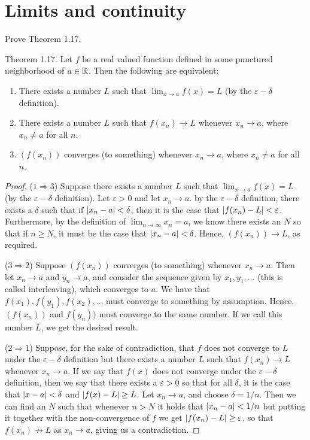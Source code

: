 \section{Limits and continuity}


\begin{exercise}{40}
Prove Theorem 1.17. 

Theorem 1.17. Let $f$ be a real valued function defined in some punctured neighborhood of $a\in\mathbb{R}$. Then the following are equivalent:
\begin{enumerate}
    \item There exists a number $L$ such that $\lim_{x\to a}f(x)=L$ (by the $\varepsilon-\delta$ definition).
    \item There exists a number $L$ such that $f(x_n)\to L$ whenever $x_n\to a$, where $x_n\neq a$ for all $n$.
    \item $(f(x_n))$ converges (to something) whenever $x_n\to a$, where $x_n\neq a$ for all $n$.
\end{enumerate}
\end{exercise}
\begin{proof}
($1\Rightarrow 3$) Suppose there exists a number $L$ such that $\lim_{x\to a}f(x) =L$ (by the $\varepsilon-\delta$ definition). Let $\varepsilon>0$ and let $x_n\to a$. by the $\varepsilon-\delta$ definition, there exists a $\delta$ such that if $\left\lvert x_n-a\right\rvert<\delta$, then it is the case that $\left\lvert f(x_n)-L\right\rvert<\varepsilon$. Furthermore, by the definition of $\lim_{n\to\infty}x_n=a$, we know there exists an $N$ so that if $n\geq N$, it must be the case that $\left\lvert x_n-a\right\rvert<\delta$. Hence, $(f(x_n))\to L$, as required.

($3\Rightarrow 2$) Suppose $(f(x_n))$ converges (to something) whenever $x_n\to a$. Then let $x_n\to a$ and $y_n\to a$, and consider the sequence given by $x_1,y_1,\dots$ (this is called interleaving), which converges to $a$. We have that $f(x_1),f(y_1),f(x_2),\dots$ must converge to something by assumption. Hence, $(f(x_n))$ and $f(y_n))$ must converge to the same number. If we call this number $L$, we get the desired result.

($2\Rightarrow 1$) Suppose, for the sake of contradiction, that $f$ does not converge to $L$ under the $\varepsilon-\delta$ definition but there exists a number $L$ such that $f(x_n)\to L$ whenever $x_n\to a$. If we say that $f(x)$ does not converge under the $\varepsilon-\delta$ definition, then we say that there exists a $\varepsilon>0$ so that for all $\delta$, it is the case that $\left\lvert x-a\right\rvert<\delta$ and $\left\lvert f(x)-L\right\rvert\geq L$. Let $x_n\to a$, and choose $\delta =1/n$. Then we can find an $N$ such that whenever $n>N$ it holds that $\left\lvert x_n-a\right\rvert<1/n$ but putting it together with the non-convergence of $f$ we get $\left\lvert f(x_n)-L\right\rvert\geq \varepsilon$, so that $f(x_n)\not\to L$ as $x_n\to a$, giving us a contradiction.
\end{proof} 

